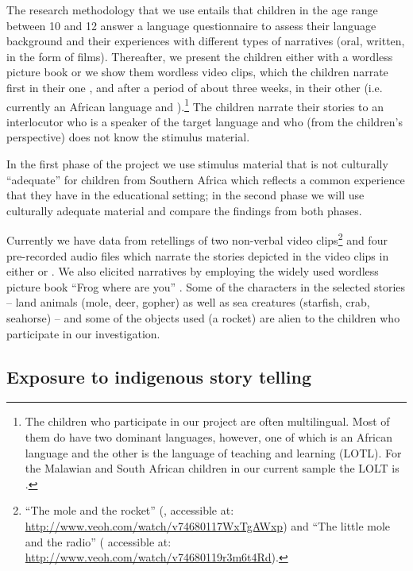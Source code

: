 \documentclass[output=paper,modfonts]{langscibook}
\begin{document}
The research methodology that we use entails that children in the age range between 10 and 12 answer a language questionnaire to assess their language background and their experiences with different types of narratives (oral, written, in the form of films). Thereafter, we present the children either with a wordless picture book or we show them wordless video clips, which the children narrate first in their one , and after a period of about three weeks, in their other  (i.e. currently an African language and ).{}\footnote{The children who participate in our project are often multilingual. Most of them do have two dominant languages, however, one of which is an African language and the other is the language of teaching and learning (LOTL). For the Malawian and South African children in our current sample the LOLT is .} The children narrate their stories to an interlocutor who is a speaker of the target language and who (from the children’s perspective) does not know the stimulus material.

In the first phase of the project we use stimulus material that is not culturally “adequate” for children from Southern Africa which reflects a common experience that they have in the educational setting; in the second phase we will use culturally adequate material and compare the findings from both phases.

Currently we have data from retellings of two non-verbal video clips\footnote{“The mole and the rocket” (\citealt{Miler1966}, accessible at: \url{http://www.veoh.com/watch/v74680117WxTgAWxp}) and “The little mole and the radio” (\citealt{Miler1968} accessible at: \url{http://www.veoh.com/watch/v74680119r3m6t4Rd}).} and four pre-recorded audio files which narrate the stories depicted in the video clips in either  or . We also elicited narratives by employing the widely used wordless picture book “Frog where are you” \citep{Mayer1969}. Some of the characters in the selected stories – land animals (mole, deer, gopher) as well as sea creatures (starfish, crab, seahorse) – and some of the objects used (a rocket) are alien to the children who participate in our investigation.

\subsection{Exposure to indigenous story telling}\label{sec:tappe:4.1}
\end{document}
